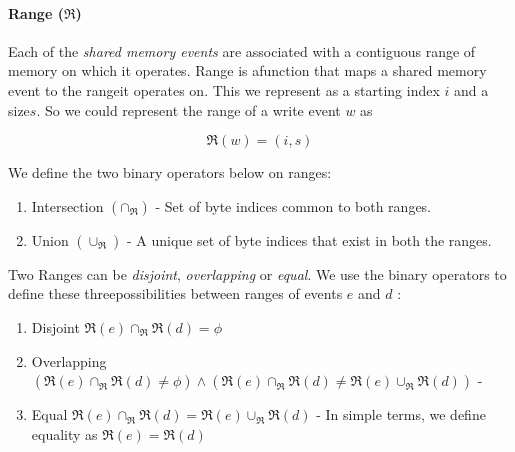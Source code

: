     \paragraph{Range ($\Re$)}
        Each of the \textit{shared memory events} are associated with a contiguous range of memory on which it operates. Range is afunction that maps a shared memory event to the range\footnotemark it operates on. This we represent as a starting index $i$ and a size$s$. So we could represent the range of a write event $w$ as 
                
                \[\Re(w) = (i, s) \]
    
        
        We define the two binary operators below on ranges: 
        \begin{enumerate}
            \item Intersection $(\cap{_\Re})$ - Set of byte indices common to both ranges.
            \item Union $(\cup_\Re)$ - A unique set of byte indices that exist in both the ranges.  
        \end{enumerate}
        
        Two Ranges can be \textit{disjoint}, \textit{overlapping} or \textit{equal}. We use the binary operators to define these threepossibilities between ranges of events $e$ and $d$ :
        \begin{enumerate}
            \item Disjoint $\Re(e) \cap_\Re \Re(d) = \phi$ 
            \item Overlapping $(\Re(e)\cap_\Re \Re(d) \neq \phi) \wedge (\Re(e) \cap_\Re  \Re(d) \neq \Re(e) \cup_\Re \Re(d))$ - 
            \item Equal $\Re(e) \cap_\Re  \Re(d) = \Re(e) \cup_\Re \Re(d)$ - In simple terms, we define equality as $\Re(e) = \Re(d)$
        \end{enumerate}
            
            
